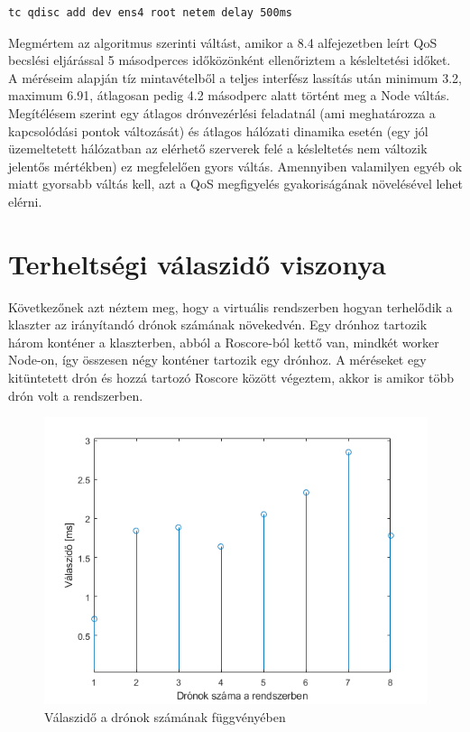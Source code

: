 \begin{lstlisting}[caption={Késleltetés hozzáadása a worker Node külső interfészéhez alapértelmezett Linux programmal}, label={lst:tc}]
tc qdisc add dev ens4 root netem delay 500ms
\end{lstlisting}

\noindent
Megmértem az algoritmus szerinti váltást, amikor a 8.4 alfejezetben leírt QoS becslési eljárással 5 másodperces időközönként ellenőriztem a késleltetési időket. A méréseim alapján tíz mintavételből a teljes interfész lassítás után minimum 3.2, maximum 6.91, átlagosan pedig 4.2 másodperc alatt történt meg a Node váltás. Megítélésem szerint egy átlagos drónvezérlési feladatnál (ami meghatározza a kapcsolódási pontok változását) és átlagos hálózati dinamika esetén (egy jól üzemeltetett hálózatban az elérhető szerverek felé a  késleltetés nem változik jelentős mértékben) ez megfelelően gyors váltás. Amennyiben valamilyen egyéb ok miatt gyorsabb váltás kell, azt a QoS megfigyelés gyakoriságának növelésével lehet elérni.

\section{Terheltségi válaszidő viszonya}
Következőnek azt néztem meg, hogy a virtuális rendszerben hogyan terhelődik a klaszter az irányítandó drónok számának növekedvén. Egy drónhoz tartozik három konténer a klaszterben, abból a Roscore-ból kettő van, mindkét worker Node-on, így összesen négy konténer tartozik egy drónhoz. A méréseket egy kitüntetett drón és hozzá tartozó Roscore között végeztem, akkor is amikor több drón volt a rendszerben.\\

\begin{figure}
	\centering
	\includegraphics{figures/meres_ping.png}
	\caption{Válaszidő a drónok számának függvényében}
	\label{fig:meresping}
\end{figure}

